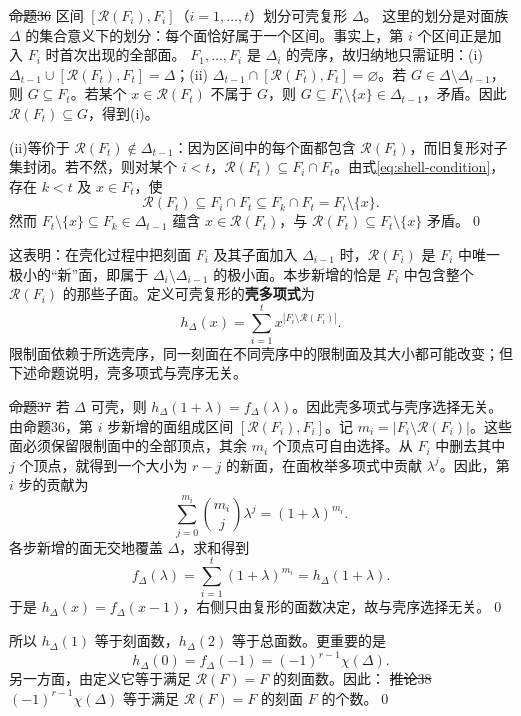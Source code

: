 \st{命题36} 区间 $[\mathcal R(F_i),F_i]$（$i=1,\ldots,t$）划分可壳复形 $\Delta$。
这里的划分是对面族 $\Delta$ 的集合意义下的划分：每个面恰好属于一个区间。事实上，第 $i$ 个区间正是加入 $F_i$ 时首次出现的全部面。
\pr $F_1,\ldots,F_i$ 是 $\Delta_i$ 的壳序，故归纳地只需证明：(i) $\Delta_{t-1}\cup[\mathcal R(F_t),F_t]=\Delta$；(ii) $\Delta_{t-1}\cap[\mathcal R(F_t),F_t]=\varnothing$。若 $G\in\Delta\setminus\Delta_{t-1}$，则 $G\subseteq F_t$。若某个 $x\in\mathcal R(F_t)$ 不属于 $G$，则 $G\subseteq F_t\setminus\{x\}\in\Delta_{t-1}$，矛盾。因此 $\mathcal R(F_t)\subseteq G$，得到(i)。

(ii)等价于 $\mathcal R(F_t)\notin\Delta_{t-1}$：因为区间中的每个面都包含 $\mathcal R(F_t)$，而旧复形对子集封闭。若不然，则对某个 $i<t$，$\mathcal R(F_t)\subseteq F_i\cap F_t$。由式\eqref{eq:shell-condition}，存在 $k<t$ 及 $x\in F_t$，使
\[\mathcal R(F_t)\subseteq F_i\cap F_t\subseteq F_k\cap F_t=F_t\setminus\{x\}.\]
然而 $F_t\setminus\{x\}\subseteq F_k\in\Delta_{t-1}$ 蕴含 $x\in\mathcal R(F_t)$，与 $\mathcal R(F_t)\subseteq F_t\setminus\{x\}$ 矛盾。\qed

这表明：在壳化过程中把刻面 $F_i$ 及其子面加入 $\Delta_{i-1}$ 时，$\mathcal R(F_i)$ 是 $F_i$ 中唯一极小的“新”面，即属于 $\Delta_i\setminus\Delta_{i-1}$ 的极小面。本步新增的恰是 $F_i$ 中包含整个 $\mathcal R(F_i)$ 的那些子面。定义可壳复形的\textbf{壳多项式}为
\[h_\Delta(x)=\sum_{i=1}^t x^{|F_i\setminus\mathcal R(F_i)|}.\tag{6}\label{eq:shell-polynomial}\]
限制面依赖于所选壳序，同一刻面在不同壳序中的限制面及其大小都可能改变；但下述命题说明，壳多项式与壳序无关。

\st{命题37} 若 $\Delta$ 可壳，则 $h_\Delta(1+\lambda)=f_\Delta(\lambda)$。因此壳多项式与壳序选择无关。
\pr 由命题36，第 $i$ 步新增的面组成区间 $[\mathcal R(F_i),F_i]$。记 $m_i=|F_i\setminus\mathcal R(F_i)|$。这些面必须保留限制面中的全部顶点，其余 $m_i$ 个顶点可自由选择。从 $F_i$ 中删去其中 $j$ 个顶点，就得到一个大小为 $r-j$ 的新面，在面枚举多项式中贡献 $\lambda^j$。因此，第 $i$ 步的贡献为
\[\sum_{j=0}^{m_i}\binom{m_i}{j}\lambda^j=(1+\lambda)^{m_i}.\]
各步新增的面无交地覆盖 $\Delta$，求和得到
\[f_\Delta(\lambda)=\sum_{i=1}^t(1+\lambda)^{m_i}=h_\Delta(1+\lambda).\]
于是 $h_\Delta(x)=f_\Delta(x-1)$，右侧只由复形的面数决定，故与壳序选择无关。\qed

所以 $h_\Delta(1)$ 等于刻面数，$h_\Delta(2)$ 等于总面数。更重要的是
\[h_\Delta(0)=f_\Delta(-1)=(-1)^{r-1}\chi(\Delta).\]
另一方面，由定义它等于满足 $\mathcal R(F)=F$ 的刻面数。因此：
\st{推论38} $(-1)^{r-1}\chi(\Delta)$ 等于满足 $\mathcal R(F)=F$ 的刻面 $F$ 的个数。\qed

